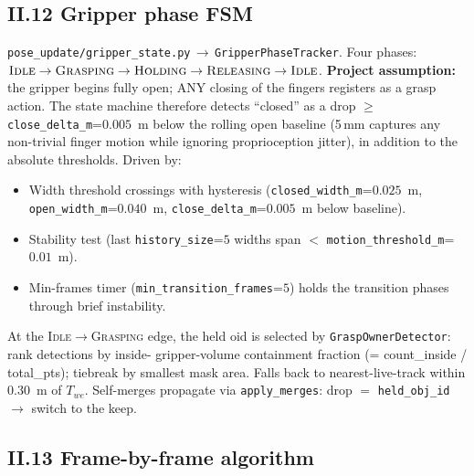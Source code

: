 \documentclass[11pt]{article}
\newcommand{\file}[1]{\texttt{#1}}
\begin{document}
\subsection*{II.12 Gripper phase FSM}

\file{pose\_update/gripper\_state.py}\,$\to$\,\texttt{GripperPhaseTracker}.
Four phases:
$\textsc{Idle}\to\textsc{Grasping}\to\textsc{Holding}\to\textsc{Releasing}\to\textsc{Idle}$.
\textbf{Project assumption:} the gripper begins fully open; ANY closing
of the fingers registers as a grasp action. The state machine therefore
detects ``closed'' as a drop $\ge $ \texttt{close\_delta\_m}=$0.005$~m
below the rolling open baseline (5\,mm captures any non-trivial finger
motion while ignoring proprioception jitter), in addition to the
absolute thresholds. Driven by:
\begin{itemize}
\item Width threshold crossings with hysteresis
  (\texttt{closed\_width\_m}=$0.025$~m, \texttt{open\_width\_m}=$0.040$~m,
  \texttt{close\_delta\_m}=$0.005$~m below baseline).
\item Stability test (last \texttt{history\_size}=$5$ widths span
  $<$ \texttt{motion\_threshold\_m}=$0.01$~m).
\item Min-frames timer (\texttt{min\_transition\_frames}=$5$) holds the
  transition phases through brief instability.
\end{itemize}
At the \textsc{Idle}$\to$\textsc{Grasping} edge, the held oid is
selected by \texttt{GraspOwnerDetector}: rank detections by inside-
gripper-volume containment fraction (= count\_inside / total\_pts);
tiebreak by smallest mask area. Falls back to nearest-live-track
within $0.30$~m of $T_{we}$. Self-merges propagate via
\texttt{apply\_merges}: drop $=$ \texttt{held\_obj\_id} $\to$ switch
to the keep.

\subsection*{II.13 Frame-by-frame algorithm}
\end{document}
